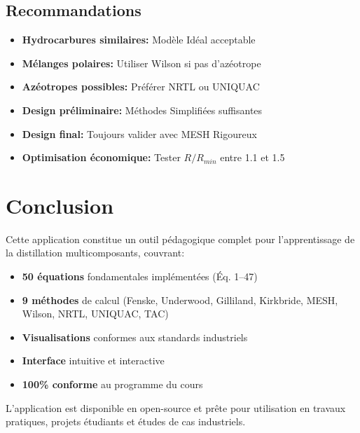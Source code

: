 \documentclass[11pt,a4paper]{article}
\begin{document}
\subsection{Recommandations}

\begin{itemize}[leftmargin=*]
    \item \textbf{Hydrocarbures similaires:} Modèle Idéal acceptable
    \item \textbf{Mélanges polaires:} Utiliser Wilson si pas d'azéotrope
    \item \textbf{Azéotropes possibles:} Préférer NRTL ou UNIQUAC
    \item \textbf{Design préliminaire:} Méthodes Simplifiées suffisantes
    \item \textbf{Design final:} Toujours valider avec MESH Rigoureux
    \item \textbf{Optimisation économique:} Tester $R/R_{min}$ entre 1.1 et 1.5
\end{itemize}

\section{Conclusion}

Cette application constitue un outil pédagogique complet pour l'apprentissage de la distillation multicomposants, couvrant:

\begin{itemize}[leftmargin=*]
    \item \textbf{50 équations} fondamentales implémentées (Éq. 1--47)
    \item \textbf{9 méthodes} de calcul (Fenske, Underwood, Gilliland, Kirkbride, MESH, Wilson, NRTL, UNIQUAC, TAC)
    \item \textbf{Visualisations} conformes aux standards industriels
    \item \textbf{Interface} intuitive et interactive
    \item \textbf{100\% conforme} au programme du cours
\end{itemize}

L'application est disponible en open-source et prête pour utilisation en travaux pratiques, projets étudiants et études de cas industriels.

\vspace{1cm}
\end{document}
